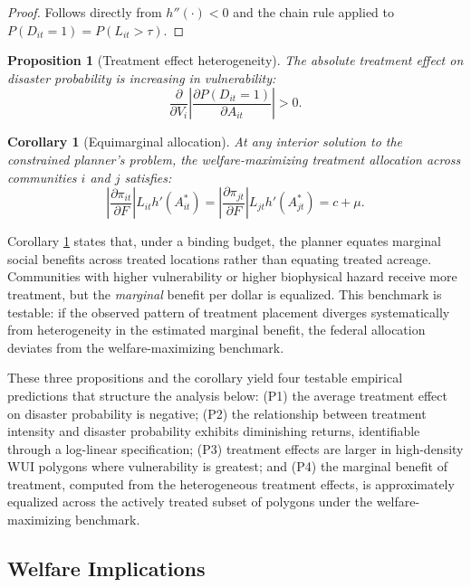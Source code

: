\documentclass[12pt, letterpaper]{article}
\newtheorem{proposition}{Proposition}
\begin{document}
\begin{proof}
Follows directly from $h''(\cdot) < 0$ and the chain rule applied to $P(D_{it} = 1) = P(L_{it} > \tau)$.
\end{proof}

\begin{proposition}[Treatment effect heterogeneity]
\label{prop:heterogeneity}
The absolute treatment effect on disaster probability is increasing in vulnerability:
$$\frac{\partial}{\partial V_i}\left|\frac{\partial P(D_{it} = 1)}{\partial A_{it}}\right| > 0.$$
\end{proposition}

\newtheorem{corollary}{Corollary}
\begin{corollary}[Equimarginal allocation]
\label{cor:equimarginal}
At any interior solution to the constrained planner's problem, the welfare-maximizing treatment allocation across communities $i$ and $j$ satisfies:
$$\left|\frac{\partial \pi_{it}}{\partial F}\right| L_{it} h'(A^*_{it}) = \left|\frac{\partial \pi_{jt}}{\partial F}\right| L_{jt} h'(A^*_{jt}) = c + \mu.$$
\end{corollary}

Corollary \ref{cor:equimarginal} states that, under a binding budget, the planner equates marginal social benefits across treated locations rather than equating treated acreage. Communities with higher vulnerability or higher biophysical hazard receive more treatment, but the \textit{marginal} benefit per dollar is equalized. This benchmark is testable: if the observed pattern of treatment placement diverges systematically from heterogeneity in the estimated marginal benefit, the federal allocation deviates from the welfare-maximizing benchmark.

These three propositions and the corollary yield four testable empirical predictions that structure the analysis below: (P1) the average treatment effect on disaster probability is negative; (P2) the relationship between treatment intensity and disaster probability exhibits diminishing returns, identifiable through a log-linear specification; (P3) treatment effects are larger in high-density WUI polygons where vulnerability is greatest; and (P4) the marginal benefit of treatment, computed from the heterogeneous treatment effects, is approximately equalized across the actively treated subset of polygons under the welfare-maximizing benchmark.

\subsection{Welfare Implications}
\end{document}
